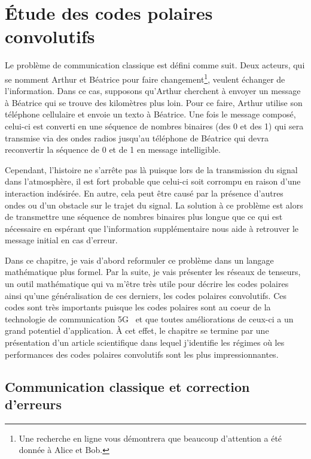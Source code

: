 \begin{comment}
\end{comment}

\chapter{Étude des codes polaires convolutifs}

Le problème de communication classique est défini comme suit.
Deux acteurs, 
qui se nomment Arthur et Béatrice pour faire changement\footnote{
  Une recherche en ligne vous démontrera que beaucoup d'attention a été donnée 
  à Alice et Bob. 
},
veulent échanger de l'information.
Dans ce cas,
supposons qu'Arthur cherchent à envoyer un message à Béatrice qui se trouve
des kilomètres plus loin.
Pour ce faire,
Arthur utilise son téléphone cellulaire et envoie un texto à Béatrice.
Une fois le message composé,
celui-ci est converti en une séquence de nombres binaires (des 0 et des 1)
qui sera transmise via des ondes radios jusqu'au téléphone de Béatrice
qui devra reconvertir la séquence de 0 et de 1 en message intelligible.

Cependant, 
l'histoire ne s'arrête pas là puisque lors de la transmission du signal
dans l'atmosphère, il est fort probable que celui-ci soit corrompu en 
raison d'une interaction indésirée.
En autre, 
cela peut être causé par la présence d'autres ondes ou d'un obstacle 
sur le trajet du signal.
La solution à ce problème est alors de transmettre une séquence de nombres binaires
plus longue que ce qui est nécessaire en espérant que l'information supplémentaire
nous aide à retrouver le message initial en cas d'erreur.

Dans ce chapitre,
je vais d'abord reformuler ce problème dans un langage mathématique plus formel.  
Par la suite, 
je vais présenter les réseaux de tenseurs,
un outil mathématique qui va m'être très utile pour décrire les codes polaires 
ainsi qu'une généralisation de ces derniers, les codes polaires convolutifs.
Ces codes sont très importants puisque les codes polaires sont au coeur 
de la technologie de communication 5G~\cite{bioglio_design_2021} et que toutes améliorations de ceux-ci
a un grand potentiel d'application.
À cet effet, le chapitre se termine par une présentation d'un article scientifique
dans lequel j'identifie les régimes où les performances des codes polaires convolutifs sont 
les plus impressionnantes.

\section{Communication classique et correction d'erreurs}

